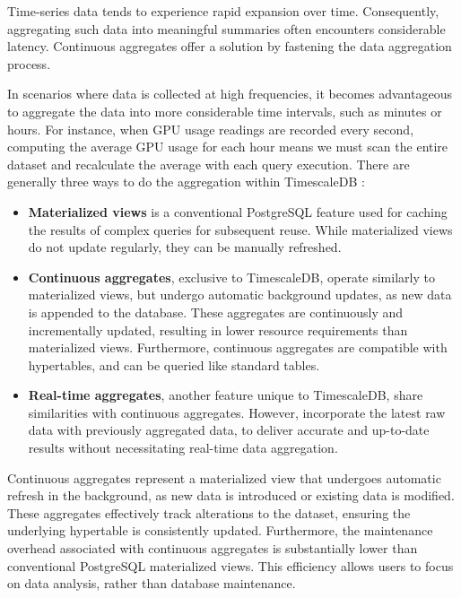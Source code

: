 
Time-series data tends to experience rapid expansion over time. Consequently, aggregating such data into meaningful summaries often encounters considerable latency. Continuous aggregates \cite{10.14778/3611540.3611559} offer a solution by fastening the data aggregation process.

In scenarios where data is collected at high frequencies, it becomes advantageous to aggregate the data into more considerable time intervals, such as minutes or hours. For instance, when GPU usage readings are recorded every second, computing the average GPU usage for each hour means we must scan the entire dataset and recalculate the average with each query execution. There are generally three ways to do the aggregation within TimescaleDB \cite{ConAggs}:

\begin{itemize}
    \item \textbf{Materialized views} is a conventional PostgreSQL feature used for caching the results of complex queries for subsequent reuse. While materialized views do not update regularly, they can be manually refreshed.

    \item \textbf{Continuous aggregates}, exclusive to TimescaleDB, operate similarly to materialized views, but undergo automatic background updates, as new data is appended to the database. These aggregates are continuously and incrementally updated, resulting in lower resource requirements than materialized views. Furthermore, continuous aggregates are compatible with hypertables, and can be queried like standard tables.

    \item \textbf{Real-time aggregates}, another feature unique to TimescaleDB, share similarities with continuous aggregates. However, incorporate the latest raw data with previously aggregated data, to deliver accurate and up-to-date results without necessitating real-time data aggregation.
\end{itemize}

Continuous aggregates represent a materialized view that undergoes automatic refresh in the background, as new data is introduced or existing data is modified. These aggregates effectively track alterations to the dataset, ensuring the underlying hypertable is consistently updated. Furthermore, the maintenance overhead associated with continuous aggregates is substantially lower than conventional PostgreSQL materialized views. This efficiency allows users to focus on data analysis, rather than database maintenance.

